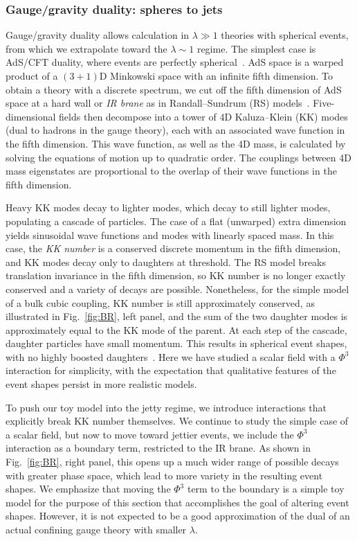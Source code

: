 \subsubsection{Gauge/gravity duality: spheres to jets}
\label{sec:darkshowerKK}

Gauge/gravity duality allows calculation in $\lambda \gg 1$ theories with spherical events, from which we extrapolate toward the $\lambda \sim 1$ regime. The simplest case is AdS/CFT duality, where events are perfectly spherical~\cite{Hofman:2008ar}. AdS space is a warped product of a $(3+1)$D Minkowski space with an infinite fifth dimension. To obtain a theory with a discrete spectrum, we cut off the fifth dimension of AdS space at a hard wall or \emph{IR brane} as in Randall--Sundrum (RS) models~\cite{RandallSundrum:1999}. Five-dimensional fields then decompose into a tower of 4D Kaluza--Klein (KK) modes (dual to hadrons in the gauge theory), each with an associated wave function in the fifth dimension. This wave function, as well as the 4D mass, is calculated by solving the equations of motion up to quadratic order. The couplings between 4D mass eigenstates are proportional to the overlap of their wave functions in the fifth dimension. 

Heavy KK modes decay to lighter modes, which decay to still lighter modes, populating a cascade of particles. The case of a flat (unwarped) extra dimension yields sinusoidal wave functions and modes with linearly spaced mass. In this case, the \emph{KK number} is a conserved discrete momentum in the fifth dimension, and KK modes decay only to daughters at threshold. The RS model breaks translation invariance in the fifth dimension, so KK number is no longer exactly conserved and a variety of decays are possible. Nonetheless, for the simple model of a bulk cubic coupling, KK number is still approximately conserved, as illustrated in Fig.~\ref{fig:BR}, left panel, and the sum of the two daughter modes is approximately equal to the KK mode of the parent. At each step of the cascade, daughter particles have small momentum. This results in spherical event shapes, with no highly boosted daughters~\cite{Csaki:2008dt}. Here we have studied a scalar field with a $\Phi^3$ interaction for simplicity, with the expectation that qualitative features of the event shapes persist in more realistic models.

To push our toy model into the jetty regime, we introduce interactions that explicitly break KK number themselves. We continue to study the simple case of a scalar field, but now to move toward jettier events, we include the $\Phi^3$ interaction as a boundary term, restricted to the IR brane. As shown in Fig.~\ref{fig:BR}, right panel, this opens up a much wider range of possible decays with greater phase space, which lead to more variety in the resulting event shapes. We emphasize that moving the $\Phi^3$ term to the boundary is a simple toy model for the purpose of this section that accomplishes the goal of altering event shapes. However, it is not expected to be a good approximation of the dual of an actual confining gauge theory with smaller $\lambda$.

